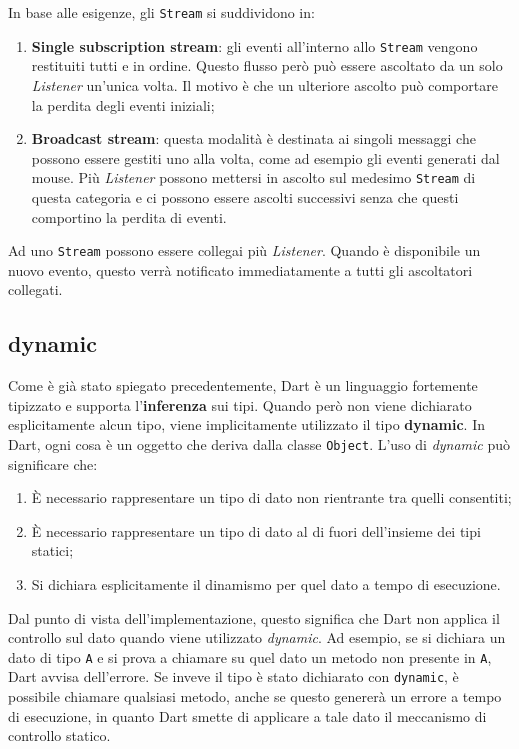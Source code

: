 In base alle esigenze, gli \verb|Stream| si suddividono in:
\begin{enumerate}
	\item \textbf{Single subscription stream}: gli eventi all'interno allo \verb|Stream| vengono restituiti tutti e in ordine. Questo flusso però può essere ascoltato da un solo \textit{Listener} un’unica volta. Il motivo è che un ulteriore ascolto può comportare la perdita degli eventi iniziali;
	\item \textbf{Broadcast stream}: questa modalità è destinata ai singoli messaggi che possono essere gestiti uno alla volta, come ad esempio gli eventi generati dal mouse. Più \textit{Listener} possono mettersi in ascolto sul medesimo \verb|Stream| di questa categoria e ci possono essere ascolti successivi senza che questi comportino la perdita di eventi.
\end{enumerate}

Ad uno \verb|Stream| possono essere collegai più \textit{Listener}. Quando è disponibile un nuovo evento, questo verrà notificato immediatamente a tutti gli ascoltatori collegati.

\subsection{dynamic}
Come è già stato spiegato precedentemente, Dart è un linguaggio fortemente tipizzato e supporta l'\textbf{inferenza} sui tipi. Quando però non viene dichiarato esplicitamente alcun tipo, viene implicitamente utilizzato il tipo \textbf{dynamic}. In Dart, ogni cosa è un oggetto che deriva dalla classe \verb|Object|. L’uso di \textit{dynamic} può significare che:
\begin{enumerate}
	\item È necessario rappresentare un tipo di dato non rientrante tra quelli consentiti;
	\item È necessario rappresentare un tipo di dato al di fuori dell'insieme dei tipi statici;
	\item Si dichiara esplicitamente il dinamismo per quel dato a tempo di esecuzione.
\end{enumerate}

Dal punto di vista dell'implementazione, questo significa che Dart non applica il controllo sul dato quando viene utilizzato \textit{dynamic}. Ad esempio, se si dichiara un dato di tipo \verb|A| e si prova a chiamare su quel dato un metodo non presente in \verb|A|, Dart avvisa dell'errore. Se inveve il tipo è stato dichiarato con \verb|dynamic|, è possibile chiamare qualsiasi metodo, anche se questo genererà un errore a tempo di esecuzione, in quanto Dart smette di applicare a tale dato il meccanismo di controllo statico.

